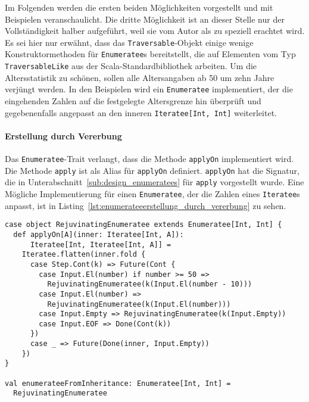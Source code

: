 Im Folgenden werden die ersten beiden Möglichkeiten vorgestellt und mit Beispielen veranschaulicht.
Die dritte Möglichkeit ist an dieser Stelle nur der Vollständigkeit halber aufgeführt, weil sie vom Autor als zu speziell erachtet wird.
Es sei hier nur erwähnt, dass das \lstinline|Traversable|-Objekt einige wenige Konstruktormethoden für \lstinline|Enumeratee|s bereitstellt, die auf Elementen vom Typ \lstinline|TraversableLike| aus der Scala-Standardbibliothek arbeiten.
Um die Altersstatistik zu schönen, sollen alle Altersangaben ab 50 um zehn Jahre verjüngt werden.
In den Beispielen wird ein \lstinline|Enumeratee| implementiert, der die eingehenden Zahlen auf die festgelegte Altersgrenze hin überprüft und gegebenenfalls angepasst an den inneren \lstinline|Iteratee[Int, Int]| weiterleitet.

\paragraph{Erstellung durch Vererbung} %
\label{par:enumerateeerstellung_durch_vererbung}\mbox{} %

Das \lstinline|Enumeratee|-Trait verlangt, dass die Methode \lstinline|applyOn| implementiert wird.
Die Methode \lstinline|apply| ist als Alias für \lstinline|applyOn| definiert.
\lstinline|applyOn| hat die Signatur, die in Unterabschnitt~\ref{sub:design_enumeratees} für \lstinline|apply| vorgestellt wurde.
Eine Mögliche Implementierung für einen \lstinline|Enumeratee|, der die Zahlen eines \lstinline|Iteratee|s anpasst, ist in Listing~\ref{lst:enumerateeerstellung_durch_vererbung} zu sehen.

\begin{lstlisting}[caption=Erstellung eines Enumeratees durch Vererbung, label=lst:enumerateeerstellung_durch_vererbung]
case object RejuvinatingEnumeratee extends Enumeratee[Int, Int] {
  def applyOn[A](inner: Iteratee[Int, A]):
      Iteratee[Int, Iteratee[Int, A]] =
    Iteratee.flatten(inner.fold {
      case Step.Cont(k) => Future(Cont {
        case Input.El(number) if number >= 50 =>
          RejuvinatingEnumeratee(k(Input.El(number - 10)))
        case Input.El(number) =>
          RejuvinatingEnumeratee(k(Input.El(number)))
        case Input.Empty => RejuvinatingEnumeratee(k(Input.Empty))
        case Input.EOF => Done(Cont(k))
      })
      case _ => Future(Done(inner, Input.Empty))
    })
}

val enumerateeFromInheritance: Enumeratee[Int, Int] =
  RejuvinatingEnumeratee
\end{lstlisting}


